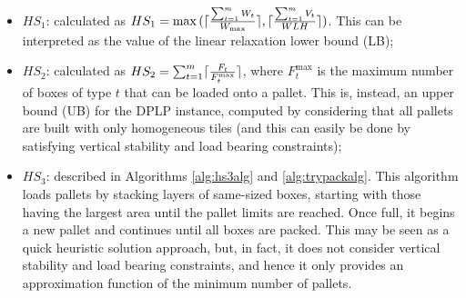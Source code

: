 \documentclass[runningheads]{llncs}
\newcommand{\rev}[1]{{#1}}
\begin{document}
\begin{itemize}
    \item $HS_1$: calculated as $HS_1 = \max{(\lceil{\sum_{t=1}^{m} {W_t}\over {W_{\max}}} \rceil,\lceil{\sum_{t=1}^{m} {V_t}\over {WLH}} \rceil)}$. \rev{This can be interpreted as the value of the linear relaxation lower bound (LB);}
    
    \item $HS_2$: calculated as $HS_2 = \sum_{t=1}^m \lceil{ {F_t} \over {{F_t^{\max}}} }\rceil$, where $F_{t}^{\max}$ is the maximum number of boxes of type $t$ that can be loaded onto a pallet. This is, instead, an upper bound (UB) for the DPLP instance, computed by considering that all pallets are built with only homogeneous tiles (and this can easily be done by satisfying vertical stability and load bearing constraints);

    \item $HS_3$: described in Algorithms \ref{alg:hs3alg} and \ref{alg:trypackalg}. This algorithm loads pallets by stacking layers of same-sized boxes, starting with those having the largest area until the pallet limits are reached. Once full, it begins a new pallet and continues until all boxes are packed. \rev{This may be seen as a quick heuristic solution approach, but, in fact, it does not consider vertical stability and load bearing constraints, and hence it only provides an approximation function of the minimum number of pallets.}
    
\end{itemize}
\end{document}
